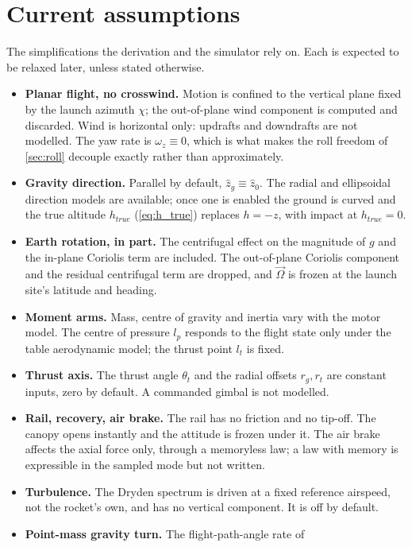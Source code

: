 \section{Current assumptions}\label{sec:assumptions}
The simplifications the derivation and the simulator rely on. Each is expected to be relaxed
later, unless stated otherwise.
\begin{itemize}
    \item \textbf{Planar flight, no crosswind.} Motion is confined to the vertical plane fixed by
    the launch azimuth $\chi$; the out-of-plane wind component is computed and discarded. Wind is
    horizontal only: updrafts and downdrafts are not modelled. The yaw rate is
    $\omega_z\equiv0$, which is what makes the roll freedom of \autoref{sec:roll} decouple
    exactly rather than approximately.
    \item \textbf{Gravity direction.} Parallel by default, $\hat{z}_g\equiv\hat{z}_0$. The radial
    and ellipsoidal direction models are available; once one is enabled the ground is curved and
    the true altitude $h_{true}$ (\autoref{eq:h_true}) replaces $h=-z$, with impact at
    $h_{true}=0$.
    \item \textbf{Earth rotation, in part.} The centrifugal effect on the magnitude of $g$ and the
    in-plane Coriolis term are included. The out-of-plane Coriolis component and the residual
    centrifugal term are dropped, and $\vec{\Omega}$ is frozen at the launch site's latitude and
    heading.
    \item \textbf{Moment arms.} Mass, centre of gravity and inertia vary with the motor model. The
    centre of pressure $l_p$ responds to the flight state only under the table aerodynamic model;
    the thrust point $l_t$ is fixed.
    \item \textbf{Thrust axis.} The thrust angle $\theta_t$ and the radial offsets $r_g,r_t$ are
    constant inputs, zero by default. A commanded gimbal is not modelled.
    \item \textbf{Rail, recovery, air brake.} The rail has no friction and no tip-off. The canopy
    opens instantly and the attitude is frozen under it. The air brake affects the axial force
    only, through a memoryless law; a law with memory is expressible in the sampled mode but not
    written.
    \item \textbf{Turbulence.} The Dryden spectrum is driven at a fixed reference airspeed, not the
    rocket's own, and has no vertical component. It is off by default.
    \item \textbf{Point-mass gravity turn.} The flight-path-angle rate of

\end{itemize}
